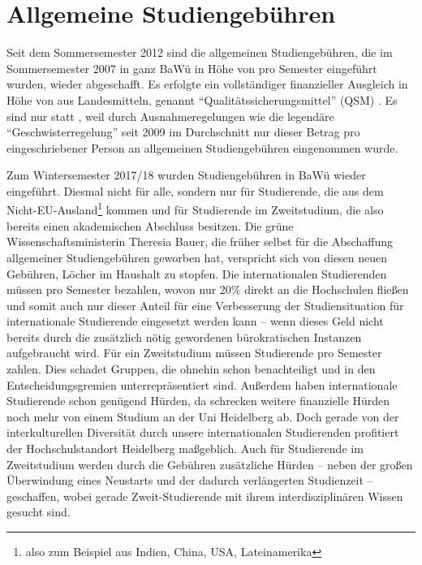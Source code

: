 \section[Allgemeine Studiengebühren]{Allgemeine Studiengebühren}


Seit dem Sommersemester 2012 sind die allgemeinen Studiengebühren, die im Sommersemester 2007 in ganz BaWü in Höhe von  pro Semester eingeführt wurden, wieder abgeschafft. Es erfolgte ein vollständiger finanzieller Ausgleich in Höhe von  aus Landesmitteln, genannt “Qualitätssicherungsmittel” (QSM)	. Es sind nur  statt , weil durch Ausnahmeregelungen wie die legendäre “Geschwisterregelung” seit 2009 im Durchschnitt nur dieser Betrag pro eingeschriebener Person an allgemeinen Studiengebühren eingenommen wurde.

Zum Wintersemester 2017/18 wurden Studiengebühren in BaWü wieder eingeführt. Diesmal nicht für alle, sondern nur für Studierende, die aus dem Nicht-EU-Ausland\footnote{also zum Beispiel aus Indien, China, USA, Lateinamerika} kommen und für Studierende im Zweitstudium, die also bereits einen akademischen Abschluss besitzen. Die grüne Wissenschaftsministerin Theresia Bauer, die früher selbst für die Abschaffung allgemeiner Studiengebühren geworben hat, verspricht sich von diesen neuen Gebühren, Löcher im Haushalt zu stopfen. Die internationalen Studierenden müssen  pro Semester bezahlen, wovon nur 20\% direkt an die Hochschulen fließen und somit auch nur dieser Anteil für eine Verbesserung der Studiensituation für internationale Studierende eingesetzt werden kann -- wenn dieses Geld nicht bereits durch die zusätzlich nötig gewordenen bürokratischen Instanzen aufgebraucht wird. Für ein Zweitstudium müssen Studierende  pro Semester zahlen. Dies schadet Gruppen, die ohnehin schon benachteiligt und in den Entscheidungsgremien unterrepräsentiert sind. Außerdem haben internationale Studierende schon genügend Hürden, da schrecken weitere finanzielle Hürden noch mehr von einem Studium an der Uni Heidelberg ab. Doch gerade von der interkulturellen Diversität durch unsere internationalen Studierenden profitiert der Hochschulstandort Heidelberg maßgeblich. Auch für Studierende im Zweitstudium werden durch die Gebühren zusätzliche Hürden -- neben der großen Überwindung eines Neustarts und der dadurch verlängerten Studienzeit -- geschaffen, wobei gerade Zweit-Studierende mit ihrem interdisziplinären Wissen gesucht sind.

